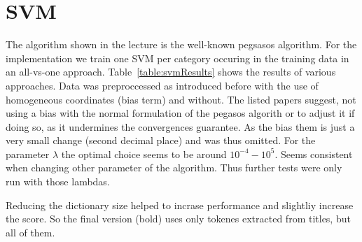 \documentclass{article}
\begin{document}
\section*{SVM}
The algorithm shown in the lecture is the well-known pegsasos algorithm\cite{shalev-shwartz_pegasos:_2011,shalev-shwartz_pegasos:_????}. For the implementation we train one SVM per category occuring in the training data in an all-vs-one approach.
Table~\ref{table:svmResults} shows the results of various approaches.
Data was preproccessed as introduced before with the use of homogeneous coordinates (bias term) and without. The listed papers suggest, not using a bias with the normal formulation of the pegasos algorith or to adjust it if doing so, as it undermines the convergences guarantee. As the bias them is just a very small change (second decimal place) and was thus omitted. For the parameter $\lambda$ the optimal choice seems to be around $10^{-4} - 10^{5}$. Seems consistent when changing other parameter of the algorithm. Thus further tests were only run with those lambdas.

Reducing the dictionary size helped to incrase performance and slightliy increase the score. So the final version (bold) uses only tokenes extracted from titles, but all of them.
\end{document}
